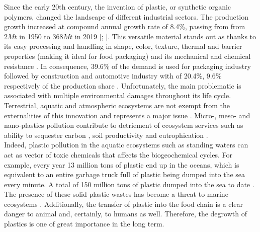 \documentclass[]{elsarticle} %
\begin{document}
Since the early 20th century, the invention of plastic, or synthetic organic polymers, changed the landscape of different industrial sectors.
The production growth increased at compound annual growth rate of 8.4\%, passing from from \(2Mt\) in 1950 to \(368Mt\) in 2019 {[}\citet{Geyer2017}; {]}.
This versatile material stands out as thanks to its easy processing and handling in shape, color, texture, thermal and barrier properties (making it ideal for food packaging) and its mechanical and chemical resistance \citep[ ]{Andrady2009, Thompson2009a}.
In consequence, 39.6\% of the demand is used for packaging industry followed by construction and automotive industry with of 20.4\%, 9.6\% respectively of the production share \citep{PlascticEurope2020}.
Unfortunately, the main problematic is associated with multiple environmental damages throughout its life cycle.
Terrestrial, aquatic and atmospheric ecosystems are not exempt from the externalities of this innovation and represents a major issue \citep{Kumar2021}.
Micro-, meso- and nano-plastics pollution contribute to detriement of ecosystem services such as ability to sequester carbon \citep{wang2022a}, soil productivity \citep{zhang2022b} and eutrophication \citep{vuori2022}.\\
Indeed, plastic pollution in the aquatic ecosystems such as standing waters can act as vector of toxic chemicals that affects the biogeochemical cycles.
For example, every year 13 million tons of plastic end up in the oceans, which is equivalent to an entire garbage truck full of plastic being dumped into the sea every minute.
A total of 150 million tons of plastic dumped into the sea to date \citep{pintodacosta2020}.
The presence of these solid plastic wastes has become a threat to marine ecosystems \citep{shi2022}.
Additionally, the transfer of plastic into the food chain is a clear danger to animal and, certainly, to humans as well.
Therefore, the degrowth of plastics is one of great importance in the long term.
\end{document}
